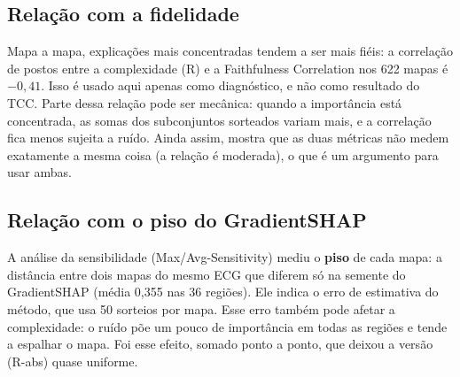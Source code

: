 \documentclass[11pt,a4paper]{article}
\begin{document}
\subsection{Relação com a fidelidade}
Mapa a mapa, explicações mais concentradas tendem a ser mais fiéis: a correlação de postos entre a complexidade (R) e a Faithfulness Correlation nos 622 mapas é $-0{,}41$. Isso é usado aqui apenas como diagnóstico, e não como resultado do TCC. Parte dessa relação pode ser mecânica: quando a importância está concentrada, as somas dos subconjuntos sorteados variam mais, e a correlação fica menos sujeita a ruído. Ainda assim, mostra que as duas métricas não medem exatamente a mesma coisa (a relação é moderada), o que é um argumento para usar ambas.

\subsection{Relação com o piso do GradientSHAP}\label{sec:piso}
A análise da sensibilidade (Max/Avg-Sensitivity) mediu o \textbf{piso} de cada mapa: a distância entre dois mapas do mesmo ECG que diferem só na semente do GradientSHAP (média 0,355 nas 36 regiões). Ele indica o erro de estimativa do método, que usa 50 sorteios por mapa. Esse erro também pode afetar a complexidade: o ruído põe um pouco de importância em todas as regiões e tende a espalhar o mapa. Foi esse efeito, somado ponto a ponto, que deixou a versão (R-abs) quase uniforme.
\end{document}
